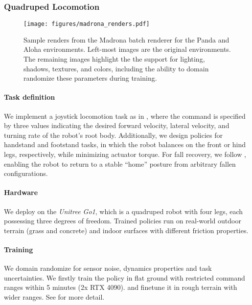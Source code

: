 \subsubsection{Quadruped Locomotion}

\begin{figure}[h]
    \centering
    \texttt{[image: figures/madrona\_renders.pdf]}
    \caption{\small Sample renders from the Madrona batch renderer for the Panda and Aloha environments. Left-most images are the original environments. The remaining images highlight the the support for lighting, shadows, textures, and colors, including the ability to domain randomize these parameters during training.}
    \label{fig:madrona_highres}
\end{figure}

\paragraph{Task definition} We implement a joystick locomotion task as in \cite{rudin2022learning, Ji_2022}, where the command is specified by three values indicating the desired forward velocity, lateral velocity, and turning rate of the robot’s root body. Additionally, we design policies for handstand and footstand tasks, in which the robot balances on the front or hind legs, respectively, while minimizing actuator torque. For fall recovery, we follow \cite{lee2019robust, smith2022legged}, enabling the robot to return to a stable ``home'' posture from arbitrary fallen configurations.

\paragraph{Hardware} We deploy on the \textit{Unitree Go1}, which is a quadruped robot with four legs, each possessing three degrees of freedom. Trained policies run on real-world outdoor terrain (grass and concrete) and indoor surfaces with different friction properties.

\paragraph{Training} We domain randomize for sensor noise, dynamics properties and task uncertainties. We firstly train the policy in flat ground with restricted command ranges within 5 minutes (2x RTX 4090). and finetune it in rough terrain with wider ranges. See  for more detail.


